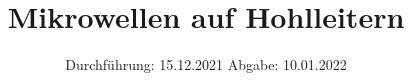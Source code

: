 

\subject{V53}
\title{Mikrowellen auf Hohlleitern}
\date{%
  Durchführung: 15.12.2021
  \hspace{3em}
  Abgabe: 10.01.2022 
}



\maketitle
\thispagestyle{empty}
\tableofcontents
\newpage







\printbibliography{}


